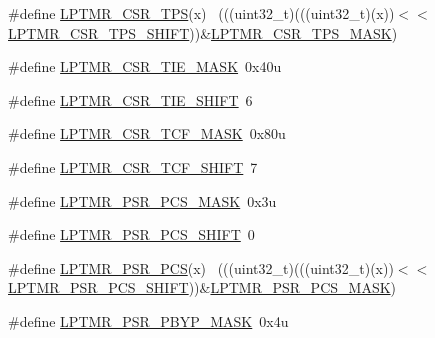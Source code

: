 \begin{DoxyCompactItemize}
\item 
\#define \hyperlink{group___l_p_t_m_r___register___masks_gac9a5296718b4ce691d3ea7be07b20a79}{L\+P\+T\+M\+R\+\_\+\+C\+S\+R\+\_\+\+T\+PS}(x)                                              ~(((uint32\+\_\+t)(((uint32\+\_\+t)(x))$<$$<$\hyperlink{group___l_p_t_m_r___register___masks_ga7759d842742bfedd91788d41ef12fb8d}{L\+P\+T\+M\+R\+\_\+\+C\+S\+R\+\_\+\+T\+P\+S\+\_\+\+S\+H\+I\+FT}))\&\hyperlink{group___l_p_t_m_r___register___masks_ga3502ccff1cbdb70bb99b73c035ab1e19}{L\+P\+T\+M\+R\+\_\+\+C\+S\+R\+\_\+\+T\+P\+S\+\_\+\+M\+A\+SK})
\item 
\#define \hyperlink{group___l_p_t_m_r___register___masks_gabb726cb43d5f6ee38339048c69a5f086}{L\+P\+T\+M\+R\+\_\+\+C\+S\+R\+\_\+\+T\+I\+E\+\_\+\+M\+A\+SK}~0x40u
\item 
\#define \hyperlink{group___l_p_t_m_r___register___masks_gaaedba0195b3abfcae6e8669f84f39d5d}{L\+P\+T\+M\+R\+\_\+\+C\+S\+R\+\_\+\+T\+I\+E\+\_\+\+S\+H\+I\+FT}~6
\item 
\#define \hyperlink{group___l_p_t_m_r___register___masks_ga13b5dd6085ca2a8cf0f06550b7557b6b}{L\+P\+T\+M\+R\+\_\+\+C\+S\+R\+\_\+\+T\+C\+F\+\_\+\+M\+A\+SK}~0x80u
\item 
\#define \hyperlink{group___l_p_t_m_r___register___masks_ga0ffa48fac670327deffc2e17ef1dea68}{L\+P\+T\+M\+R\+\_\+\+C\+S\+R\+\_\+\+T\+C\+F\+\_\+\+S\+H\+I\+FT}~7
\item 
\#define \hyperlink{group___l_p_t_m_r___register___masks_ga40daa10db43ec0c0a1944e6289ca29cc}{L\+P\+T\+M\+R\+\_\+\+P\+S\+R\+\_\+\+P\+C\+S\+\_\+\+M\+A\+SK}~0x3u
\item 
\#define \hyperlink{group___l_p_t_m_r___register___masks_gaf258bce874ad60601d6d76cefc72c52e}{L\+P\+T\+M\+R\+\_\+\+P\+S\+R\+\_\+\+P\+C\+S\+\_\+\+S\+H\+I\+FT}~0
\item 
\#define \hyperlink{group___l_p_t_m_r___register___masks_ga6b5b85beaa5760eaa1b5e0fd252bf9a2}{L\+P\+T\+M\+R\+\_\+\+P\+S\+R\+\_\+\+P\+CS}(x)                                              ~(((uint32\+\_\+t)(((uint32\+\_\+t)(x))$<$$<$\hyperlink{group___l_p_t_m_r___register___masks_gaf258bce874ad60601d6d76cefc72c52e}{L\+P\+T\+M\+R\+\_\+\+P\+S\+R\+\_\+\+P\+C\+S\+\_\+\+S\+H\+I\+FT}))\&\hyperlink{group___l_p_t_m_r___register___masks_ga40daa10db43ec0c0a1944e6289ca29cc}{L\+P\+T\+M\+R\+\_\+\+P\+S\+R\+\_\+\+P\+C\+S\+\_\+\+M\+A\+SK})
\item 
\#define \hyperlink{group___l_p_t_m_r___register___masks_gab3daae6085cf702b31db5be78fe03872}{L\+P\+T\+M\+R\+\_\+\+P\+S\+R\+\_\+\+P\+B\+Y\+P\+\_\+\+M\+A\+SK}~0x4u
\item 

\end{DoxyCompactItemize}
